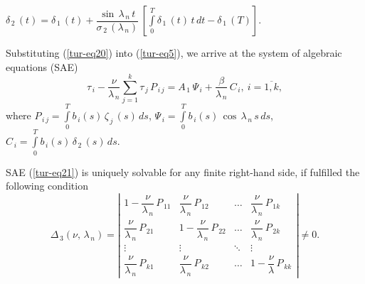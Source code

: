 ﻿\documentclass[
11pt,%
tightenlines,%
twoside,%
onecolumn,%
nofloats,%
nobibnotes,%
nofootinbib,%
superscriptaddress,%
noshowpacs,%
centertags]%
{revtex4}
\begin{document}
$\delta_{\, 2} \, (t)=\delta_{\, 1} \, (t)+\dfrac{\sin \, \lambda_{\, n} \, t}{\sigma_{\, 2} \, (\lambda_{\, n})} \, \left[ \int \limits_{0}^T \delta_{\, 1} \, (t) \, t \, d t-\delta_{\, 1} \, (T) \right]$.

	Substituting (\ref{tur-eq20}) into (\ref{tur-eq5}), we arrive at the system of algebraic equations (SAE) 
\begin{equation} \label{tur-eq21}	
\tau_{\, i}-\dfrac{\nu}{\lambda_{\, n}} \sum \limits_{j=1}^{k} \tau_{\, j} \, P_{\, i \, j}=A_{\, 1} \, 
\Psi_{\, i}+\dfrac{\beta}{\lambda_{\, n}} \, C_{\, i} , \: i=\overline{1 , k} ,
\end{equation}
where $P_{\, i \, j}=\int \limits_{0}^{T} b_{\, i} (s) \, \zeta_{\, j} \, (s) \, d s$,
$\Psi_{\, i}=\int \limits_{0}^{T}  b_{\, i} (s) \, \cos \, \lambda_{\, n} \, s \, d s $,
$C_{\, i}=\int \limits_{0}^{T}  b_{\, i} (s) \, \delta_{\, 2} \, (s) \, d s $.
     
SAE (\ref{tur-eq21}) is uniquely solvable for any finite right-hand side,  if fulfilled the following condition
\begin {equation}\label{tur-eq22}
\Delta_{\, 3} (\nu , \, \lambda_{\, n})=\left| \begin{array}{cccc}
1-\dfrac{\nu}{\lambda_{\, n}} \, P_{\, 11 } & \dfrac{\nu}{\lambda_{\, n}} \, P_{\, 12 }& \ldots & \dfrac{\nu}{\lambda_{\, n}} \, P_{\, 1 k } \\
\dfrac{\nu}{\lambda_{\, n}} \, P_{\, 21 } & 1-\dfrac{\nu}{\lambda_{\, n}} \, P_{\, 22 } &  \ldots & \dfrac{\nu}{\lambda_{\, n}} \, P_{\, 2 k } \\
\vdots &  \vdots &  \ddots & \vdots \\
\dfrac{\nu}{\lambda_{\, n}} \, P_{\, k 1 } & \dfrac{\nu}{\lambda_{\, n}} \, P_{\, k 2 } &   \ldots  & 1-\dfrac{\nu}{\lambda} \, P_{\, k k }
\end{array} \right| \ne 0 .
\end{equation}	
             
\end{document}
